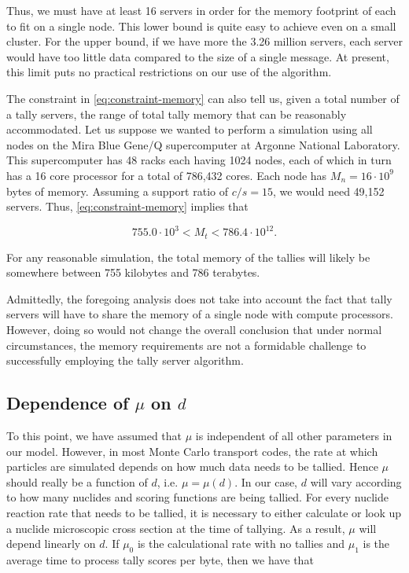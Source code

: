 \documentclass[3p]{elsarticle}
\begin{document}
\noindent Thus, we must have at least 16 servers in order for the memory
footprint of each to fit on a single node. This lower bound is quite easy to
achieve even on a small cluster. For the upper bound, if we have more the 3.26
million servers, each server would have too little data compared to the size of
a single message. At present, this limit puts no practical restrictions on our
use of the algorithm.

The constraint in \eqref{eq:constraint-memory} can also tell us, given a total
number of a tally servers, the range of total tally memory that can be
reasonably accommodated. Let us suppose we wanted to perform a simulation using
all nodes on the Mira Blue Gene/Q supercomputer at Argonne National
Laboratory. This supercomputer has 48 racks each having 1024 nodes, each of
which in turn has a 16 core processor for a total of 786,432 cores. Each node
has $M_n = 16 \cdot 10^9$ bytes of memory. Assuming a support ratio of $c/s =
15$, we would need 49,152 servers. Thus, \eqref{eq:constraint-memory} implies
that

\begin{equation}
  \label{eq:constraint-mira}
  755.0 \cdot 10^3 < M_t < 786.4 \cdot 10^{12}.
\end{equation}

\noindent For any reasonable simulation, the total memory of the tallies will
likely be somewhere between 755 kilobytes and 786 terabytes.

Admittedly, the foregoing analysis does not take into account the fact that
tally servers will have to share the memory of a single node with compute
processors. However, doing so would not change the overall conclusion that under
normal circumstances, the memory requirements are not a formidable challenge to
successfully employing the tally server algorithm.

\subsection{Dependence of \texorpdfstring{$\mu$ on $d$}{u on d}}

To this point, we have assumed that $\mu$ is independent of all other parameters
in our model. However, in most Monte Carlo transport codes, the rate at which
particles are simulated depends on how much data needs to be tallied. Hence
$\mu$ should really be a function of $d$, i.e. $\mu = \mu(d)$. In our case, $d$
will vary according to how many nuclides and scoring functions are being
tallied. For every nuclide reaction rate that needs to be tallied, it is
necessary to either calculate or look up a nuclide microscopic cross section at
the time of tallying. As a result, $\mu$ will depend linearly on $d$. If $\mu_0$
is the calculational rate with no tallies and $\mu_1$ is the average time to
process tally scores per byte, then we have that
\end{document}
